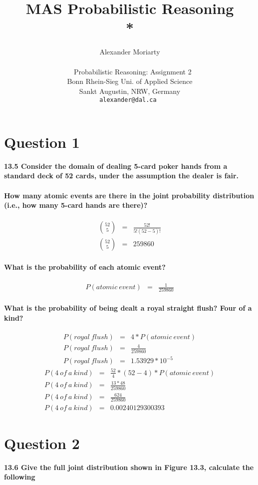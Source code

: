 \documentclass[a4paper, 12 pt, conference, onecolumn]{IEEEconf}
\title{\LARGE \bf
MAS Probabilistic Reasoning\\* 
}
\author{Alexander Moriarty\\~\\~
        Probabilistic Reasoning: Assignment 2\\
        Bonn Rhein-Sieg Uni. of Applied Science\\ 
        Sankt Augustin, NRW, Germany\\
        \tt\small alexander@dal.ca
}
\begin{document}
\maketitle

\section{Question 1}
\textbf{13.5 Consider the domain of dealing 5-card poker hands from a standard deck of 52 cards, under the assumption the dealer is fair.}
\paragraph{How many atomic events are there in the joint probability distribution (i.e., how many 5-card hands are there)?}
\begin{eqnarray}
{52 \choose 5} &=& \frac{52!}{5!(52-5)!} \\
{52 \choose 5} &=& 259860
\end{eqnarray}
\paragraph{What is the probability of each atomic event?}
\begin{eqnarray}
P(atomic~event) &=& \frac{1}{259860}
\end{eqnarray}
\paragraph{What is the probability of being dealt a royal straight flush? Four of a kind?}
\begin{eqnarray}
P(royal~flush) &=& 4*P(atomic~event) \\
P(royal~flush) &=& \frac{4}{259860} \\
P(royal~flush) &=& 1.53929*10^{-5}
\end{eqnarray}
\begin{eqnarray}
P(4~of~a~kind) &=& \frac{52}{4}*(52-4)*P(atomic~event) \\
P(4~of~a~kind) &=& \frac{13*48}{259860} \\
P(4~of~a~kind) &=& \frac{624}{259860} \\
P(4~of~a~kind) &=& 0.00240129300393
\end{eqnarray}

\setcounter{paragraph}{0}
\section{Question 2}
\textbf{13.6 Give the full joint distribution shown in Figure 13.3, calculate the following}
\end{document}
